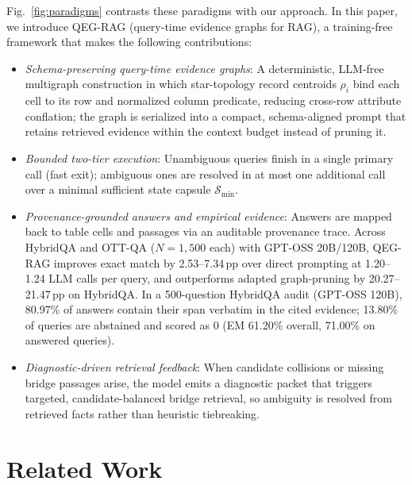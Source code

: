 \documentclass[runningheads]{llncs}
\begin{document}
Fig.~\ref{fig:paradigms} contrasts these paradigms with our approach. In this paper, we introduce QEG-RAG (query-time evidence graphs for RAG), a training-free framework that makes the following contributions:
\begin{itemize}
    \item \emph{Schema-preserving query-time evidence graphs}: A deterministic, LLM-free multigraph construction in which star-topology record centroids $\rho_i$ bind each cell to its row and normalized column predicate, reducing cross-row attribute conflation; the graph is serialized into a compact, schema-aligned prompt that retains retrieved evidence within the context budget instead of pruning it.
    \item \emph{Bounded two-tier execution}: Unambiguous queries finish in a single primary call (fast exit); ambiguous ones are resolved in at most one additional call over a minimal sufficient state capsule $\mathcal{S}_{\min}$.
    \item \emph{Provenance-grounded answers and empirical evidence}: Answers are mapped back to table cells and passages via an auditable provenance trace. Across HybridQA and OTT-QA ($N=1{,}500$ each) with GPT-OSS 20B/120B, QEG-RAG improves exact match by 2.53--7.34\,pp over direct prompting at 1.20--1.24 LLM calls per query, and outperforms adapted graph-pruning by 20.27--21.47\,pp on HybridQA. In a 500-question HybridQA audit (GPT-OSS 120B), 80.97\% of answers contain their span verbatim in the cited evidence; 13.80\% of queries are abstained and scored as 0 (EM 61.20\% overall, 71.00\% on answered queries).
    \item \emph{Diagnostic-driven retrieval feedback}: When candidate collisions or missing bridge passages arise, the model emits a diagnostic packet that triggers targeted, candidate-balanced bridge retrieval, so ambiguity is resolved from retrieved facts rather than heuristic tiebreaking.
\end{itemize}

\section{Related Work}
\label{sec:related}


\end{document}

